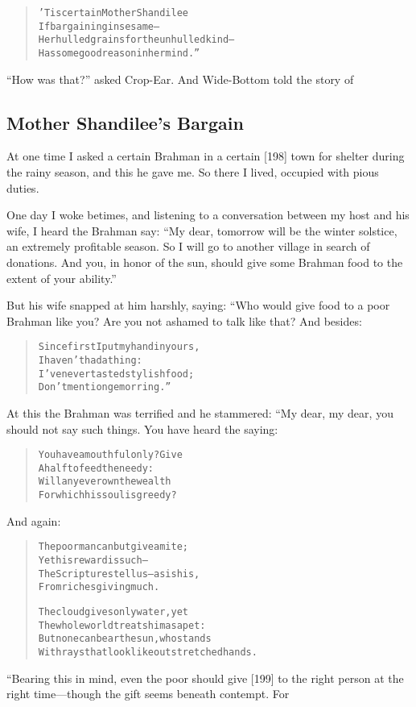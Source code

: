 \documentclass[article, twoside, 14pt]{memoir}
\renewenvironment{verbatim}{%
\begin{quote}%
\vskip -10pt%
\begin{alltt}\normalfont\large}{\end{alltt}%
\end{quote}%
\vskip -10pt
} %
\begin{document}
\begin{verbatim}
'Tis certain Mother Shandilee
If bargaining in sesame--
Her hulled grains for the unhulled kind--
Has some good reason in her mind.”
\end{verbatim}
``How was that?'' asked Crop-Ear. And Wide-Bottom told the story
of

\subsection{Mother Shandilee's Bargain}

\label{s39}

At one time I asked a certain Brahman in a certain [198] town for
shelter during the rainy season, and this he gave me. So there I
lived, occupied with pious duties.

One day I woke betimes, and listening to a conversation between my
host and his wife, I heard the Brahman say:
``My dear, tomorrow will be the winter solstice, an extremely profitable season. So I will go to another village in search of donations. And you, in honor of the sun, should give some Brahman food to the extent of your ability.''

But his wife snapped at him harshly, saying: “Who would give food
to a poor Brahman like you? Are you not ashamed to talk like that?
And besides:

\begin{verbatim}
Since first I put my hand in yours,
    I haven't had a thing:
I've never tasted stylish food;
    Don't mention gem or ring.”
\end{verbatim}
At this the Brahman was terrified and he stammered: “My dear, my
dear, you should not say such things. You have heard the saying:

\begin{verbatim}
You have a mouthful only? Give
    A half to feed the needy:
Will any ever own the wealth
    For which his soul is greedy?
\end{verbatim}
And again:

\begin{verbatim}
The poor man can but give a mite;
    Yet his reward is such--
The Scriptures tell us--as is his,
    From riches giving much.

The cloud gives only water, yet
The whole world treats him as a pet:
But none can bear the sun, who stands
With rays that look like outstretched hands.
\end{verbatim}
“Bearing this in mind, even the poor should give [199] to the right
person at the right time---though the gift seems beneath contempt.
For
\end{document}
